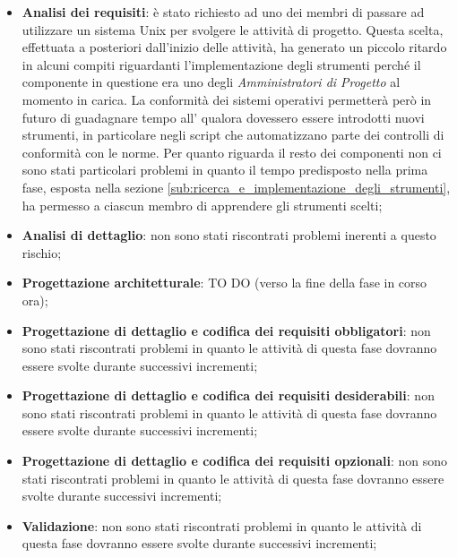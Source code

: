 			\begin{itemize}
				\item \textbf{Analisi dei requisiti}: è stato richiesto ad uno dei membri di passare ad utilizzare un sistema Unix per svolgere le attività di progetto. Questa scelta, effettuata a posteriori dall'inizio delle attività, ha generato un piccolo ritardo in alcuni compiti riguardanti l'implementazione degli strumenti perché il componente in questione era uno degli \emph{Amministratori di Progetto} al momento in carica. \newline
				La conformità dei sistemi operativi permetterà però in futuro di guadagnare tempo all'\roleAdministrator{} qualora dovessero essere introdotti nuovi strumenti, in particolare negli script che automatizzano parte dei controlli di conformità con le norme. \newline
				Per quanto riguarda il resto dei componenti non ci sono stati particolari problemi in quanto il tempo predisposto nella prima fase, esposta nella sezione \ref{sub:ricerca_e_implementazione_degli_strumenti}, ha permesso a ciascun membro di apprendere gli strumenti scelti;
				\item \textbf{Analisi di dettaglio}: non sono stati riscontrati problemi inerenti a questo rischio;
				\item \textbf{Progettazione architetturale}: TO DO (verso la fine della fase in corso ora);
				\item \textbf{Progettazione di dettaglio e codifica dei requisiti obbligatori}: non sono stati riscontrati problemi in quanto le attività di questa fase dovranno essere svolte durante successivi incrementi;
				\item \textbf{Progettazione di dettaglio e codifica dei requisiti desiderabili}: non sono stati riscontrati problemi in quanto le attività di questa fase dovranno essere svolte durante successivi incrementi;
				\item \textbf{Progettazione di dettaglio e codifica dei requisiti opzionali}: non sono stati riscontrati problemi in quanto le attività di questa fase dovranno essere svolte durante successivi incrementi;
				\item \textbf{Validazione}: non sono stati riscontrati problemi in quanto le attività di questa fase dovranno essere svolte durante successivi incrementi;
			\end{itemize}



